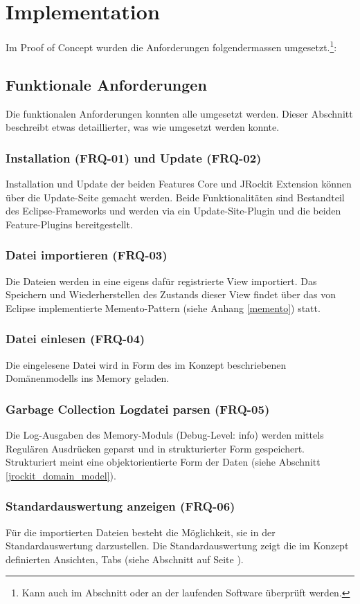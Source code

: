 \chapter{Implementation}\label{implementation}
Im Proof of Concept wurden die Anforderungen folgendermassen umgesetzt.\footnote{Kann auch im Abschnitt  oder an der laufenden Software überprüft werden.}:
\section{Funktionale Anforderungen}
Die funktionalen Anforderungen konnten alle umgesetzt werden. Dieser Abschnitt beschreibt etwas detaillierter, was wie umgesetzt werden konnte.

\subsection{Installation (FRQ-01) und Update (FRQ-02)}
Installation und Update der beiden Features Core und JRockit Extension können über die Update-Seite gemacht werden. Beide Funktionalitäten sind Bestandteil des Eclipse-Frameworks und werden via ein Update-Site-Plugin und die beiden Feature-Plugins bereitgestellt.

\subsection{Datei importieren (FRQ-03)}
Die Dateien werden in eine eigens dafür registrierte View importiert. Das Speichern und Wiederherstellen des Zustands dieser View findet über das von Eclipse implementierte Memento-Pattern (siehe Anhang \ref{memento}) statt. 

\subsection{Datei einlesen (FRQ-04)}
Die eingelesene Datei wird in Form des im Konzept beschriebenen Domänenmodells ins Memory geladen. 

\subsection{Garbage Collection Logdatei parsen (FRQ-05)}
Die Log-Ausgaben des Memory-Moduls (Debug-Level: info) werden mittels Regulären Ausdrücken geparst und in strukturierter Form gespeichert. Strukturiert meint eine objektorientierte Form der Daten (siehe Abschnitt \ref{jrockit_domain_model}).

\subsection{Standardauswertung anzeigen (FRQ-06)}
Für die importierten Dateien besteht die Möglichkeit, sie in der Standardauswertung darzustellen. Die Standardauswertung zeigt die im Konzept definierten Ansichten, Tabs (siehe Abschnitt  auf Seite \pageref{standardreport}).

